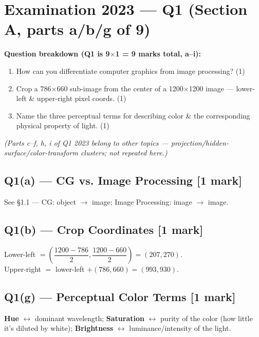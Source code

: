 \documentclass[12pt, a4paper]{article}
\newenvironment{solutionbox}{\begin{mdframed}[style=solutionframe]}{\end{mdframed}}
\newenvironment{answerbox}{\begin{mdframed}[style=answerframe]}{\end{mdframed}}
\begin{document}
\section{Examination 2023 --- Q1 (Section A, parts a/b/g of 9)}

\begin{solutionbox}
\textbf{Question breakdown (Q1 is 9$\times$1 = 9 marks total, a--i):}
\begin{enumerate}[noitemsep]
  \item[(a)] How can you differentiate computer graphics from image processing? (1)
  \item[(b)] Crop a 786$\times$660 sub-image from the center of a 1200$\times$1200 image --- lower-left \& upper-right pixel coords. (1)
  \item[(g)] Name the three perceptual terms for describing color \& the corresponding physical property of light. (1)
\end{enumerate}
\emph{(Parts c--f, h, i of Q1 2023 belong to other topics --- projection/hidden-surface/color-transform clusters; not repeated here.)}
\end{solutionbox}

\subsection*{Q1(a) --- CG vs. Image Processing [1 mark]}
See \S1.1 --- CG: object $\to$ image; Image Processing: image $\to$ image.

\subsection*{Q1(b) --- Crop Coordinates [1 mark]}
\begin{answerbox}
Lower-left $= \left(\dfrac{1200-786}{2}, \dfrac{1200-660}{2}\right) = (207, 270)$. \\
Upper-right $=$ lower-left $+ (786, 660) = (993, 930)$.
\end{answerbox}

\subsection*{Q1(g) --- Perceptual Color Terms [1 mark]}
\begin{answerbox}
\textbf{Hue} $\leftrightarrow$ dominant wavelength; \textbf{Saturation} $\leftrightarrow$ purity of the color (how little it's diluted by white); \textbf{Brightness} $\leftrightarrow$ luminance/intensity of the light.
\end{answerbox}
\end{document}
